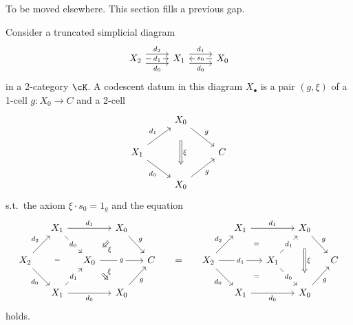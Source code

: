 \documentclass[a4paper,11pt,oneside,openany]{scrbook}
\begin{document}
To be moved elsewhere. This section fills a previous gap.

\begin{defn}
    Consider a truncated simplicial diagram
    \[\begin{tikzcd}
        {X_2} & {X_1} & {X_0}
        \arrow["{s_0}"{description}, from=1-3, to=1-2]
        \arrow["{d_1}", shift left=2, from=1-2, to=1-3]
        \arrow["{d_0}"', shift right=2, from=1-2, to=1-3]
        \arrow["{d_1}"{description}, from=1-1, to=1-2]
        \arrow["{d_2}", shift left=2, from=1-1, to=1-2]
        \arrow["{d_0}"', shift right=2, from=1-1, to=1-2]
    \end{tikzcd}\]
    in a 2-category $\cK$. A codescent datum in this diagram $X_\bullet$ is a pair
    $(g,\xi)$ of a 1-cell $g\colon X_0\rightarrow C$ and a 2-cell
    \[\begin{tikzcd}
        & {X_0} \\
        {X_1} && C \\
        & {X_0}
        \arrow["g", from=1-2, to=2-3]
        \arrow["g"', from=3-2, to=2-3]
        \arrow["{d_0}"', from=2-1, to=3-2]
        \arrow["{d_1}", from=2-1, to=1-2]
        \arrow["\xi", shorten <=13pt, shorten >=13pt, Rightarrow, from=1-2, to=3-2]
    \end{tikzcd}\]
    s.t.\ the axiom $\xi\cdot s_0=1_g$ and the equation
    \[\begin{tikzcd}[column sep=small]
        & {X_1} && {X_0} &&&& {X_1} && {X_0} \\
        {X_2} && {X_0} && C & {=} & {X_2} && {X_1} && C \\
        & {X_1} && {X_0} &&&& {X_1} && {X_0}
        \arrow["{d_0}"{description}, from=1-2, to=2-3]
        \arrow["{d_1}"{description}, from=3-2, to=2-3]
        \arrow["{d_0}"', from=2-1, to=3-2]
        \arrow["{d_2}", from=2-1, to=1-2]
        \arrow["{=}"{description}, Rightarrow, draw=none, from=1-2, to=3-2]
        \arrow["{d_1}", from=1-2, to=1-4]
        \arrow["{d_0}"', from=3-2, to=3-4]
        \arrow["g", from=1-4, to=2-5]
        \arrow["g"', from=3-4, to=2-5]
        \arrow["g"{description}, from=2-3, to=2-5]
        \arrow["\xi", shorten <=8pt, shorten >=8pt, Rightarrow, from=2-3, to=3-4]
        \arrow["\xi", shorten <=8pt, shorten >=8pt, Rightarrow, from=1-4, to=2-3]
        \arrow["g", from=1-10, to=2-11]
        \arrow["g"', from=3-10, to=2-11]
        \arrow["{d_0}"{description}, from=2-9, to=3-10]
        \arrow["{d_1}"{description}, from=2-9, to=1-10]
        \arrow["\xi", shorten <=13pt, shorten >=13pt, Rightarrow, from=1-10, to=3-10]
        \arrow["{d_1}", from=1-8, to=1-10]
        \arrow["{d_0}"', from=3-8, to=3-10]
        \arrow["{d_0}"', from=2-7, to=3-8]
        \arrow["{d_2}", from=2-7, to=1-8]
        \arrow["{d_1}"{description}, from=2-7, to=2-9]
        \arrow["{=}"{description}, draw=none, from=1-8, to=2-9]
        \arrow["{=}"{description}, draw=none, from=2-9, to=3-8]
    \end{tikzcd}\]
    holds.


\end{defn}
\end{document}
